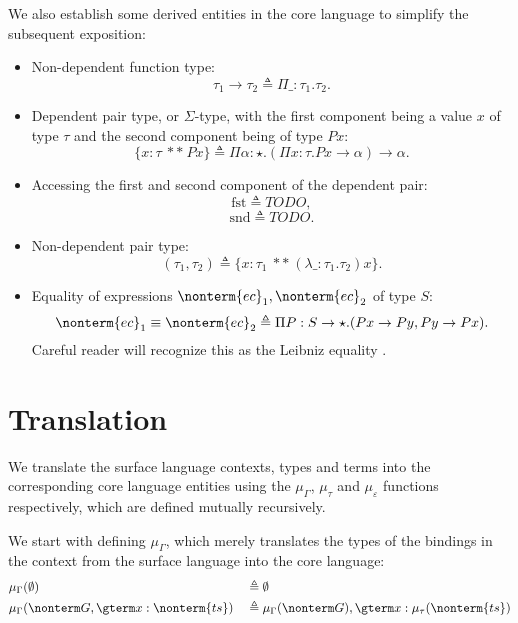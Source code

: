 \documentclass[a4paper]{article}
\begin{document}
We also establish some derived entities in the core language to simplify the subsequent exposition:

\begin{itemize}
  \item Non-dependent function type:
    \[
      \tau_1 \rightarrow \tau_2 \triangleq \Pi \_ : \tau_1. \tau_2.
    \]
  \item Dependent pair type, or $\Sigma$-type, with the first component being a value $x$ of type $\tau$ and the second component being of type $P x$:
    \[
      \{ x : \tau\ **\ P x \} \triangleq \Pi \alpha : \star. (\Pi x : \tau. P x \rightarrow \alpha) \rightarrow \alpha.
    \]
  \item Accessing the first and second component of the dependent pair:
    \[
      \text{fst} \triangleq TODO,
    \]
    \[
      \text{snd} \triangleq TODO.
    \]
  \item Non-dependent pair type:
    \[
      (\tau_1, \tau_2) \triangleq \{ x : \tau_1\ **\ (\lambda \_ : \tau_1. \tau_2) x \}.
    \]
  \item Equality of expressions $\nonterm{ec}_1, \nonterm{ec}_2$ of type $S$:
    \[
      \nonterm{ec}_1 \equiv \nonterm{ec}_2 \triangleq \Pi P : S \rightarrow \star. (P x \rightarrow P y, P y \rightarrow P x).
    \]
    Careful reader will recognize this as the Leibniz equality \cite{FindSomethingForThis}.
\end{itemize}

\section{Translation}

We translate the surface language contexts, types and terms into the corresponding core language entities
using the $\mu_\Gamma$, $\mu_\tau$ and $\mu_\varepsilon$ functions respectively,
which are defined mutually recursively.

We start with defining $\mu_\Gamma$,
which merely translates the types of the bindings in the context from the surface language into the core language:
\begin{equation}
\begin{aligned}
  & \mu_\Gamma(\emptyset)                                       && \triangleq \emptyset                                                     \\
  & \mu_\Gamma(\nonterm G, \gterm x : \nonterm{ts})             && \triangleq \mu_\Gamma(\nonterm G), \gterm x : \mu_\tau(\nonterm{ts})     \\
\end{aligned}
\end{equation}
\end{document}
